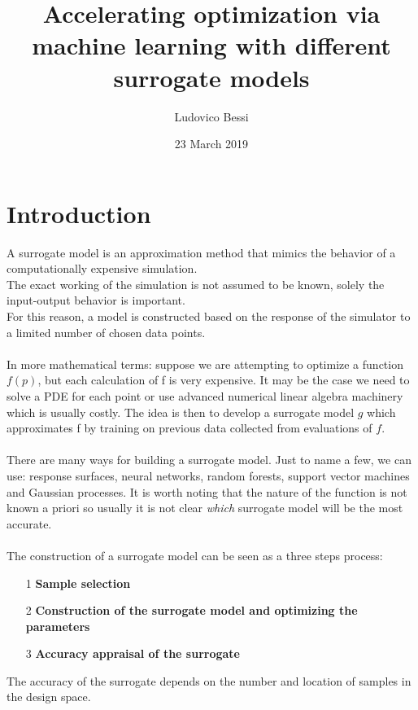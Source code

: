 \documentclass[11pt,a4paper,oneside,titlepage,openright]{book}
\begin{document}
 
\title{Accelerating optimization via machine learning with different surrogate models}
\author{Ludovico Bessi}

\date{23 March 2019}
\maketitle



\chapter*{Introduction}
A surrogate model is an approximation method that mimics the behavior of a computationally expensive simulation.\\
The exact working of the simulation is not assumed to be known, solely the input-output behavior is important. \\
For this reason, a model is constructed based on the response of the simulator to a limited number of chosen data points.\\\\
In more mathematical terms: suppose we are attempting to optimize a function $f(p)$, but each calculation of f is very expensive. It may be the case we need to solve a PDE for each point or use advanced numerical linear algebra machinery which is usually costly. 
The idea is then to develop a surrogate model $g$ which approximates f by training on previous data collected from evaluations of $f$.\\\\
There are many ways for building a surrogate model. Just to name a few, we can use: response surfaces, neural networks, random forests, support vector machines and Gaussian processes. It is worth noting that the nature of the function is not known a priori so usually it  is not clear \textit{which} surrogate model will be the most accurate.\\\\
The construction of a surrogate model can be seen as a three steps process:
\begin{itemize}
\item[1]\textbf{Sample selection}
\item[2]\textbf{Construction of the surrogate model and optimizing the parameters}
\item[3]\textbf{Accuracy appraisal of the surrogate}
\end{itemize}
The accuracy of the surrogate depends on the number and location of samples in the design space. 
\newpage
\end{document}
